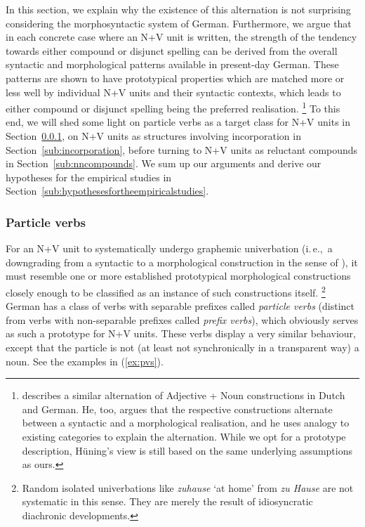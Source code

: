 \documentclass[biblatex, charis, linguex]{glossa}\usepackage{knitr}
\newcommand{\ie}{i.\,e.,\ }
\begin{document}
In this section, we explain why the existence of this alternation is not surprising considering the morphosyntactic system of German.
Furthermore, we argue that in each concrete case where an N+V unit is written, the strength of the tendency towards either compound or disjunct spelling can be derived from the overall syntactic and morphological patterns available in present-day German.
These patterns are shown to have prototypical properties which are matched more or less well by individual N+V units and their syntactic contexts, which leads to either compound or disjunct spelling being the preferred realisation.%
\footnote{\citet{Huening2010} describes a similar alternation of Adjective + Noun constructions in Dutch and German.
He, too, argues that the respective constructions alternate between a syntactic and a morphological realisation, and he uses analogy to existing categories to explain the alternation.
While we opt for a prototype description, Hüning's view is still based on the same underlying assumptions as ours.}
To this end, we will shed some light on particle verbs as a target class for N+V units in Section~\mbox{\ref{sub:particleverbs}}, on N+V units as structures involving incorporation in Section~\mbox{\ref{sub:incorporation}}, before turning to N+V units as reluctant compounds in Section~\mbox{\ref{sub:nncompounds}}.
We sum up our arguments and derive our hypotheses for the empirical studies in Section~\ref{sub:hypothesesfortheempiricalstudies}.

\subsubsection{Particle verbs}
\label{sub:particleverbs}

For an N+V unit to systematically undergo graphemic univerbation (\ie a downgrading from a syntactic to a morphological construction in the sense of \citealt[206]{Lehmann2020}), it must resemble one or more established prototypical morphological constructions closely enough to be classified as an instance of such constructions itself.%
\footnote{Random isolated univerbations like \textit{zuhause} `at home' from \textit{zu Hause} are not systematic in this sense.
They are merely the result of idiosyncratic diachronic developments.}
German has a class of verbs with separable prefixes called \textit{particle verbs} (distinct from verbs with non-separable prefixes called \textit{prefix verbs}), which obviously serves as such a prototype for N+V units.
These verbs display a very similar behaviour, except that the particle is not (at least not synchronically in a transparent way) a noun.
See the examples in (\ref{ex:pvs}).
\end{document}
